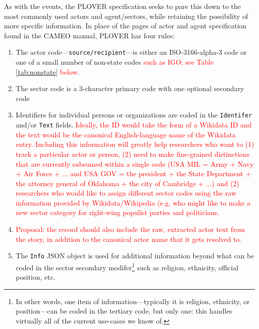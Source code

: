 \documentclass[11pt]{report}
\newcommand{\fn}[1]{\footnote{#1}}
\newcommand{\andy}[1]{\textcolor{red}{#1}}
\begin{document}
As with the events, the PLOVER specification seeks to pare this down to the most commonly used actors and agent/sectors, while retaining the possibility of more specific information. In place of the pages of actor and agent specification found in the CAMEO manual, PLOVER has four rules:

\begin{enumerate}
\item The actor code---\texttt{source/recipient}---is either an ISO-3166-alpha-3 code or one of a small number of non-state codes \andy{such as IGO; see Table \ref{tab:nonstate} below}.
\item The sector code is a 3-character primary code with one optional secondary code
\item Identifiers for individual persons or organizations are coded in the \texttt{Identifer} and/or \texttt{Text} fields. \andy{Ideally, the ID would take the form of a Wikidata ID and the text would be the canonical English-language name of the Wikidata entry. Including this information will greatly help researchers who want to (1) track a particular actor or person, (2) need to make fine-grained distinctions that are currently subsumed within a single code (USA MIL = Army + Navy + Air Force + ... and USA GOV = the president + the State Department + the attorney general of Oklahoma + the city of Cambridge + ...) and (2) researchers who would like to assign different sector codes using the raw information provided by Wikidata/Wikipedia (e.g. who might like to make a new sector category for right-wing populist parties and politicians.}
\item \andy{Proposal: the record should also include the raw, extracted actor text from the story, in addition to the canonical actor name that it gets resolved to.}
\item The \texttt{Info} JSON object is used for additional information beyond what can be coded in the sector secondary modifer\fn{In other words, one item of information---typically it is religion, ethnicity, or position---can be coded in the tertiary code, but only one: this handles virtually all of the current use-cases we know of.} such as religion, ethnicity, official position, etc.
\end{enumerate}
\end{document}
